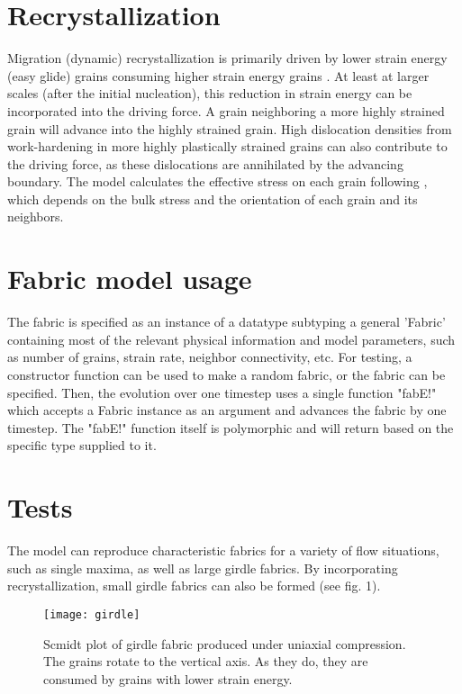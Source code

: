 \documentclass{article}
\begin{document}
\section{Recrystallization}
Migration (dynamic) recrystallization is primarily driven by lower strain energy (easy glide) grains consuming higher strain energy grains \citep{duval1995}. At least at larger scales (after the initial nucleation), this reduction in strain energy can be incorporated into the driving force. A grain neighboring a more highly strained grain will advance into the highly strained grain. High dislocation densities from work-hardening in more highly plastically strained grains can also contribute to the driving force, as these dislocations are annihilated by the advancing boundary. The model calculates the effective stress on each grain following \citet{azuma96}, which depends on the bulk stress and the orientation of each grain and its neighbors. 

\section{Fabric model usage}
The fabric is specified as an instance of a datatype subtyping a general 'Fabric' containing most of the relevant physical information and model parameters, such as number of grains, strain rate, neighbor connectivity, etc. For testing, a constructor function can be used to make a random fabric, or the fabric can be specified. Then, the evolution over one timestep uses a single function "fabE!" which accepts a Fabric instance as an argument and advances the fabric by one timestep. The "fabE!" function itself is polymorphic and will return based on the specific type supplied to it.

\section{Tests}
The model can reproduce characteristic fabrics for a variety of flow situations, such as single maxima, as well as large girdle fabrics. By incorporating recrystallization, small girdle fabrics can also be formed (see fig. 1).

\begin{figure}
\caption{Scmidt plot of girdle fabric produced under uniaxial compression. The grains rotate to the vertical axis. As they do, they are consumed by grains with lower strain energy.} 
\texttt{[image: girdle]}
\end{figure}
\end{document}

